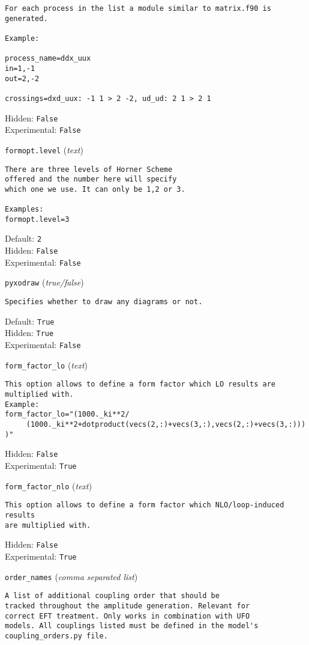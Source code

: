 \begin{basedescript}{\desclabelstyle{\pushlabel}}
\begin{verbatim}
For each process in the list a module similar to matrix.f90 is
generated.

Example:

process_name=ddx_uux
in=1,-1
out=2,-2

crossings=dxd_uux: -1 1 > 2 -2, ud_ud: 2 1 > 2 1
\end{verbatim}
Hidden: \verb|False|
\\Experimental: \verb|False|
\\\item[\colorbox{gray!30}{\texttt{formopt.level}}] (\textit{text})
\begin{verbatim}
There are three levels of Horner Scheme
offered and the number here will specify
which one we use. It can only be 1,2 or 3.

Examples:
formopt.level=3
\end{verbatim}
Default: \verb|2|
\\Hidden: \verb|False|
\\Experimental: \verb|False|
\\\item[\colorbox{gray!30}{\texttt{pyxodraw}}] (\textit{true/false})
\begin{verbatim}
Specifies whether to draw any diagrams or not.
\end{verbatim}
Default: \verb|True|
\\Hidden: \verb|True|
\\Experimental: \verb|False|
\\\item[\colorbox{gray!30}{\texttt{form\_factor\_lo}}] (\textit{text})
\begin{verbatim}
This option allows to define a form factor which LO results are
multiplied with.
Example:
form_factor_lo="(1000._ki**2/
     (1000._ki**2+dotproduct(vecs(2,:)+vecs(3,:),vecs(2,:)+vecs(3,:)))
)"
\end{verbatim}
Hidden: \verb|False|
\\Experimental: \verb|True|
\\\item[\colorbox{gray!30}{\texttt{form\_factor\_nlo}}] (\textit{text})
\begin{verbatim}
This option allows to define a form factor which NLO/loop-induced results
are multiplied with.
\end{verbatim}
Hidden: \verb|False|
\\Experimental: \verb|True|
\\\item[\colorbox{gray!30}{\texttt{order\_names}}] (\textit{comma separated list})
\begin{verbatim}
A list of additional coupling order that should be
tracked throughout the amplitude generation. Relevant for
correct EFT treatment. Only works in combination with UFO
models. All couplings listed must be defined in the model's
coupling_orders.py file.


\end{verbatim}
\end{basedescript}
